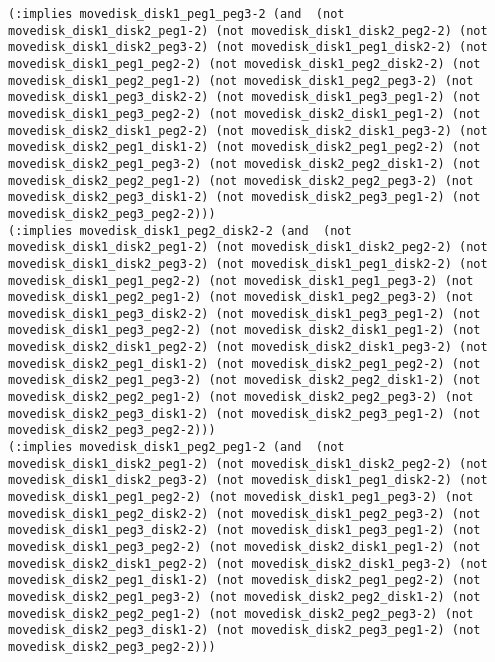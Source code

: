 \documentclass[12pt,letterpaper]{ntdhw}
\begin{document}
\begin{enumerate}
\begin{enumerate}
\begin{lstlisting}[language=pddl, style=pddlstyle,
  basicstyle=\scriptsize]
(:implies movedisk_disk1_peg1_peg3-2 (and  (not movedisk_disk1_disk2_peg1-2) (not movedisk_disk1_disk2_peg2-2) (not movedisk_disk1_disk2_peg3-2) (not movedisk_disk1_peg1_disk2-2) (not movedisk_disk1_peg1_peg2-2) (not movedisk_disk1_peg2_disk2-2) (not movedisk_disk1_peg2_peg1-2) (not movedisk_disk1_peg2_peg3-2) (not movedisk_disk1_peg3_disk2-2) (not movedisk_disk1_peg3_peg1-2) (not movedisk_disk1_peg3_peg2-2) (not movedisk_disk2_disk1_peg1-2) (not movedisk_disk2_disk1_peg2-2) (not movedisk_disk2_disk1_peg3-2) (not movedisk_disk2_peg1_disk1-2) (not movedisk_disk2_peg1_peg2-2) (not movedisk_disk2_peg1_peg3-2) (not movedisk_disk2_peg2_disk1-2) (not movedisk_disk2_peg2_peg1-2) (not movedisk_disk2_peg2_peg3-2) (not movedisk_disk2_peg3_disk1-2) (not movedisk_disk2_peg3_peg1-2) (not movedisk_disk2_peg3_peg2-2)))
(:implies movedisk_disk1_peg2_disk2-2 (and  (not movedisk_disk1_disk2_peg1-2) (not movedisk_disk1_disk2_peg2-2) (not movedisk_disk1_disk2_peg3-2) (not movedisk_disk1_peg1_disk2-2) (not movedisk_disk1_peg1_peg2-2) (not movedisk_disk1_peg1_peg3-2) (not movedisk_disk1_peg2_peg1-2) (not movedisk_disk1_peg2_peg3-2) (not movedisk_disk1_peg3_disk2-2) (not movedisk_disk1_peg3_peg1-2) (not movedisk_disk1_peg3_peg2-2) (not movedisk_disk2_disk1_peg1-2) (not movedisk_disk2_disk1_peg2-2) (not movedisk_disk2_disk1_peg3-2) (not movedisk_disk2_peg1_disk1-2) (not movedisk_disk2_peg1_peg2-2) (not movedisk_disk2_peg1_peg3-2) (not movedisk_disk2_peg2_disk1-2) (not movedisk_disk2_peg2_peg1-2) (not movedisk_disk2_peg2_peg3-2) (not movedisk_disk2_peg3_disk1-2) (not movedisk_disk2_peg3_peg1-2) (not movedisk_disk2_peg3_peg2-2)))
(:implies movedisk_disk1_peg2_peg1-2 (and  (not movedisk_disk1_disk2_peg1-2) (not movedisk_disk1_disk2_peg2-2) (not movedisk_disk1_disk2_peg3-2) (not movedisk_disk1_peg1_disk2-2) (not movedisk_disk1_peg1_peg2-2) (not movedisk_disk1_peg1_peg3-2) (not movedisk_disk1_peg2_disk2-2) (not movedisk_disk1_peg2_peg3-2) (not movedisk_disk1_peg3_disk2-2) (not movedisk_disk1_peg3_peg1-2) (not movedisk_disk1_peg3_peg2-2) (not movedisk_disk2_disk1_peg1-2) (not movedisk_disk2_disk1_peg2-2) (not movedisk_disk2_disk1_peg3-2) (not movedisk_disk2_peg1_disk1-2) (not movedisk_disk2_peg1_peg2-2) (not movedisk_disk2_peg1_peg3-2) (not movedisk_disk2_peg2_disk1-2) (not movedisk_disk2_peg2_peg1-2) (not movedisk_disk2_peg2_peg3-2) (not movedisk_disk2_peg3_disk1-2) (not movedisk_disk2_peg3_peg1-2) (not movedisk_disk2_peg3_peg2-2)))

\end{lstlisting}
\end{enumerate}
\end{enumerate}
\end{document}
